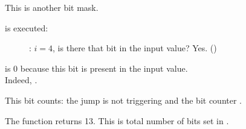 This is another bit mask.

\clearpage
\AND is executed:

\begin{figure}[H]
\centering
{}
\caption{\olly: $i=4$, 
is there that bit in the input value? Yes. ()}
\label{fig:shifts_olly4_3}
\end{figure}

\ZF is 0 because this bit is present in the input value.\\
Indeed, . 

This bit counts: the jump is not triggering and the bit counter 
.

The function returns 13. 
This is total number of bits set in .

